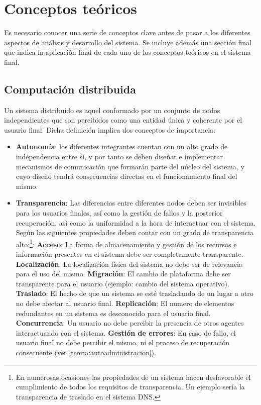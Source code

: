 \chapter{Conceptos teóricos}

\begin{cabstract}
Es necesario conocer una serie de conceptos clave antes de pasar a los diferentes aspectos de análisis y desarrollo del sistema. Se incluye además una sección final que indica la aplicación final de cada uno de los conceptos teóricos en el sistema final.
\end{cabstract}

\section{Computación distribuida}

Un sistema distribuido es aquel conformado por un conjunto de nodos independientes que son percibidos como una entidad única y coherente por el usuario final. Dicha definición implica dos conceptos de importancia:

\begin{itemize}
  \item \textbf{Autonomía}: los diferentes integrantes cuentan con un alto grado de independencia entre sí, y por tanto se deben diseñar e implementar mecanismos de comunicación que formarán parte del núcleo del sistema, y cuyo diseño tendrá consecuencias directas en el funcionamiento final del mismo.
  \item \textbf{Transparencia}: Las diferencias entre diferentes nodos deben ser invisibles para los usuarios finales, así como la gestión de fallos y la posterior recuperación, así como la uniformidad a la hora de interactuar con el sistema. Según \cite{Tanenbaum:2006:DSP:1202502:Ch1} las siguientes propiedades deben contar con un grado de transparencia alto:\footnote{En numerosas ocasiones las propiedades de un sistema hacen desfavorable el cumplimiento de todos los requisitos de transparencia. Un ejemplo sería la transparencia de traslado en el sistema DNS.}:
\label{transparencia}
  \subitem \textbf{Acceso}: La forma de almacenamiento y gestión de los recursos e información presentes en el sistema debe ser completamente transparente.
  \subitem \textbf{Localización}: La localización física del sistema no debe ser de relevancia para el uso del mismo.
  \subitem \textbf{Migración}: El cambio de plataforma debe ser transparente para el usuario (ejemplo: cambio del sistema operativo).
  \subitem \textbf{Traslado}: El hecho de que un sistema se esté trasladando de un lugar a otro no debe afectar al usuario final.
  \subitem \textbf{Replicación}: El numero de elementos redundantes en un sistema es desconocido para el usuario final.
  \subitem \textbf{Concurrencia}: Un usuario no debe percibir la presencia de otros agentes interactuando con el sistema.
  \subitem \textbf{Gestión de errores}: En caso de fallo, el usuario final no debe percibir el mismo, ni el proceso de recuperación consecuente (ver \ref{teoria:autoadministracion}).
\end{itemize}

